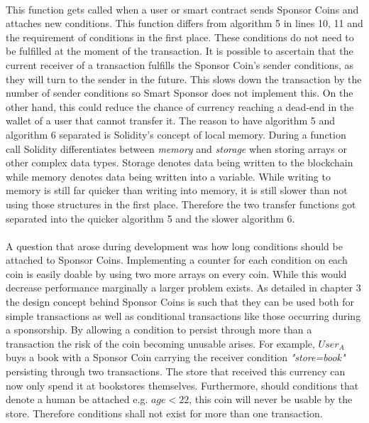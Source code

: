 \\
This function gets called when a user or smart contract sends Sponsor Coins and attaches new conditions. This function differs from algorithm 5 in lines 10, 11 and the requirement of conditions in the first place. These conditions do not need to be fulfilled at the moment of the transaction. It is possible to ascertain that the current receiver of a transaction fulfills the Sponsor Coin's sender conditions, as they will turn to the sender in the future. This slows down the transaction by the number of sender conditions so Smart Sponsor does not implement this. On the other hand, this could reduce the chance of currency reaching a dead-end in the wallet of a user that cannot transfer it. The reason to have algorithm 5 and algorithm 6 separated is Solidity's concept of local memory. During a function call Solidity differentiates between \emph{memory} and \emph{storage} when storing arrays or other complex data types. Storage denotes data being written to the blockchain while memory denotes data being written into a variable. While writing to memory is still far quicker than writing into memory, it is still slower than not using those structures in the first place. Therefore the two transfer functions got separated into the quicker algorithm 5 and the slower algorithm 6.\\
\\
A question that arose during development was how long conditions should be attached to Sponsor Coins. Implementing a counter for each condition on each coin is easily doable by using two more arrays on every coin. While this would decrease performance marginally a larger problem exists. As detailed in chapter 3 the design concept behind Sponsor Coins is such that they can be used both for simple transactions as well as conditional transactions like those occurring during a sponsorship. By allowing a condition to persist through more than a transaction the risk of the coin becoming unusable arises. For example, $User_A$ buys a book with a Sponsor Coin carrying the receiver condition \emph{"store=book"} persisting through two transactions. The store that received this currency can now only spend it at bookstores themselves. Furthermore, should conditions that denote a human be attached e.g. $age<22$, this coin will never be usable by the store. Therefore conditions shall not exist for more than one transaction.\\
\\
